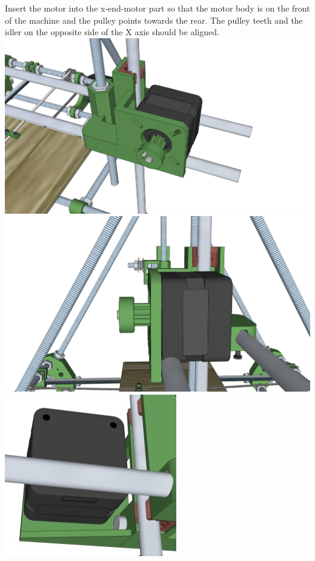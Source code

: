 \documentclass[twoside,a4paper,titlepage]{memoir}
\begin{document}
	\section{}
	Insert the motor into the x-end-motor part so that the motor body is on the front of the machine and the
	pulley points towards the rear. The pulley teeth and the idler on the opposite side of the X axis should
	be aligned.\\
	\includegraphics[width=1\linewidth]{graphics/ch9_5_1.png}
	\includegraphics[width=1\linewidth]{graphics/ch9_5_2.png}
	\includegraphics[width=1\linewidth]{graphics/ch9_5_3.png}	
\end{document}
